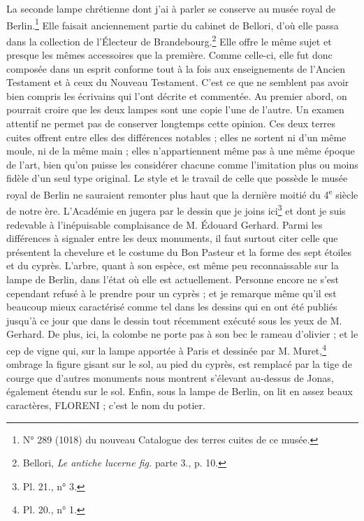 \documentclass{article}
\begin{document}
La seconde lampe chrétienne dont j'ai à parler se conserve au musée royal de Berlin.\footnote{N° 289 (1018) du nouveau Catalogue des terres cuites de ce musée.} Elle faisait anciennement partie du cabinet de Bellori, d'où elle passa dans la collection de l'Électeur de Brandebourg.\footnote{Bellori, \emph{Le antiche lucerne fig.} parte 3., p. 10.} Elle offre le même sujet et presque les mêmes accessoires que la première. Comme celle-ci, elle fut donc composée dans un esprit conforme tout à la fois aux enseignements de l'Ancien Testament et à ceux du Nouveau Testament. C'est ce que ne semblent pas avoir bien compris les écrivains qui l'ont décrite et commentée. Au premier abord, on pourrait croire que les deux lampes sont une copie l'une de l'autre. Un examen attentif ne permet pas de conserver longtemps cette opinion. Ces deux terres cuites offrent entre elles des différences notables ; elles ne sortent ni d'un même moule, ni de la même main ; elles n'appartiennent même pas à une même époque de l'art, bien qu'on puisse les considérer chacune comme l'imitation plus ou moins fidèle d'un seul type original. Le style et le travail de celle que possède le musée royal de Berlin ne sauraient remonter plus haut que la dernière moitié du 4\textsuperscript{e} siècle de notre ère. L'Académie en jugera par le dessin que je joins ici\footnote{Pl. 21., n° 3.} et dont je suis redevable à l'inépuisable complaisance de M. Édouard Gerhard. Parmi les différences à signaler entre les deux monuments, il faut surtout citer celle que présentent la chevelure et le costume du Bon Pasteur et la forme des sept étoiles et du cyprès. L'arbre, quant à son espèce, est même peu reconnaissable sur la lampe de Berlin, dans l'état où elle est actuellement. Personne encore ne s'est cependant refusé à le prendre pour un cyprès ; et je remarque même qu'il est beaucoup mieux caractérisé comme tel dans les dessins qui en ont été publiés jusqu'à ce jour que dans le dessin tout récemment exécuté sous les yeux de M. Gerhard. De plus, ici, la colombe ne porte pas à son bec le rameau d'olivier ; et le cep de vigne qui, sur la lampe apportée à Paris et dessinée par M. Muret,\footnote{Pl. 20., n° 1.} ombrage la figure gisant sur le sol, au pied du cyprès, est remplacé par la tige de courge que d'autres monuments nous montrent s'élevant au-dessus de Jonas, également étendu sur le sol. Enfin, sous la lampe de Berlin, on lit en assez beaux caractères, FLORENI ; c'est le nom du potier.
\end{document}
